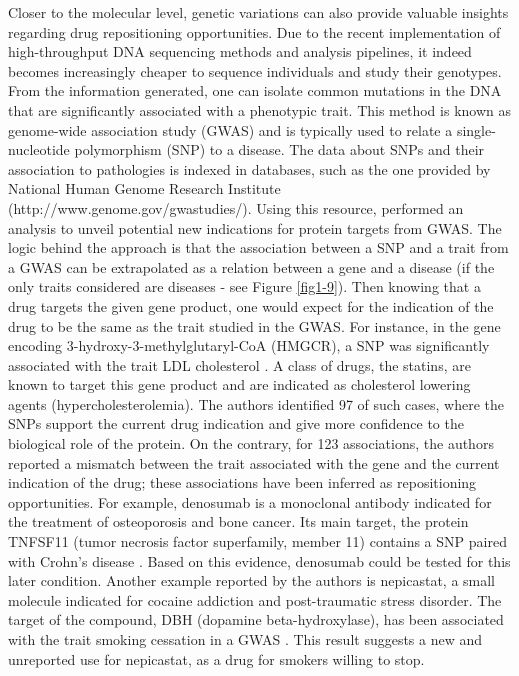Closer to the molecular level, genetic variations can also provide valuable insights regarding drug repositioning opportunities. Due to the recent implementation of high-throughput DNA sequencing methods and analysis pipelines, it indeed becomes increasingly cheaper to sequence individuals and study their genotypes. From the information generated, one can isolate common mutations in the DNA that are significantly associated with a phenotypic trait. This method is known as genome-wide association study (GWAS) and is typically used to relate a single-nucleotide polymorphism (SNP) to a disease. The data about SNPs and their association to pathologies is indexed in databases, such as the one provided by National Human Genome Research Institute (http://www.genome.gov/gwastudies/). Using this resource, \citep{sanseau2012use} performed an analysis to unveil potential new indications for protein targets from GWAS. The logic behind the approach is that the association between a SNP and a trait from a GWAS can be extrapolated as a relation between a gene and a disease (if the only traits considered are diseases - see Figure \ref{fig1-9}). Then knowing that a drug targets the given gene product, one would expect for the indication of the drug to be the same as the trait studied in the GWAS. For instance, in the gene encoding 3-hydroxy-3-methylglutaryl-CoA (HMGCR), a SNP was significantly associated with the trait LDL cholesterol \citep{kathiresan2008six}. A class of drugs, the statins, are known to target this gene product and are indicated as cholesterol lowering agents (hypercholesterolemia). The authors identified 97 of such cases, where the SNPs support the current drug indication and give more confidence to the biological role of the protein. On the contrary, for 123 associations, the authors reported a mismatch between the trait associated with the gene and the current indication of the drug; these associations have been inferred as repositioning opportunities. For example, denosumab is a monoclonal antibody indicated for the treatment of osteoporosis and bone cancer. Its main target, the protein TNFSF11 (tumor necrosis factor superfamily, member 11) contains a SNP paired with Crohn’s disease \citep{franke2010genome}. Based on this evidence, denosumab could be tested for this later condition. Another example reported by the authors is nepicastat, a small molecule indicated for cocaine addiction and post-traumatic stress disorder. The target of the compound, DBH (dopamine beta-hydroxylase), has been associated with the trait smoking cessation in a GWAS \citep{furberg2010genome}. This result suggests a new and unreported use for nepicastat, as a drug for smokers willing to stop.

